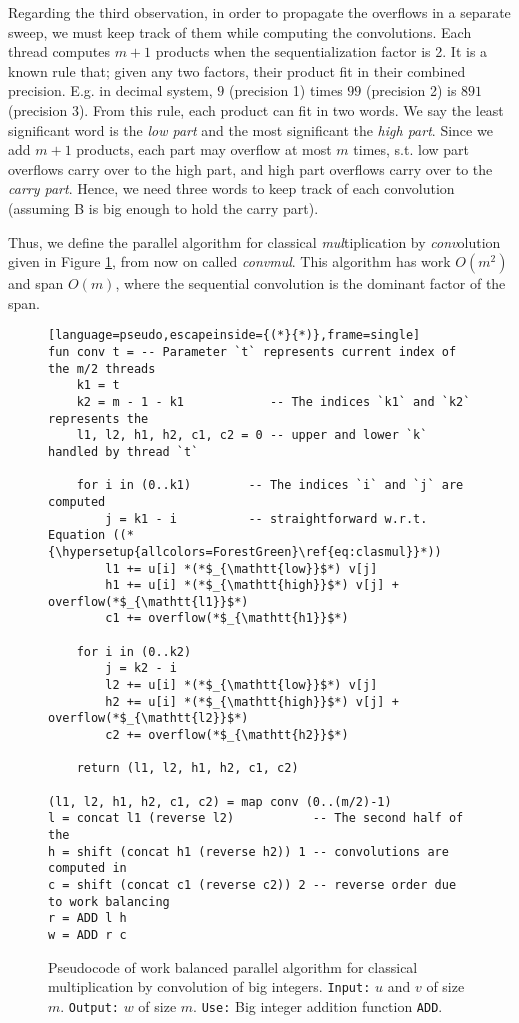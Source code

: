 Regarding the third observation, in order to propagate the overflows in a
separate sweep, we must keep track of them while computing the
convolutions. Each thread computes $m+1$ products when the sequentialization
factor is 2. It is a known rule that; given any two factors, their product fit
in their combined precision. E.g. in decimal system, $9$ (precision 1) times
$99$ (precision 2) is $891$ (precision 3). From this rule, each product can fit
in two words. We say the least significant word is the \textit{low part} and the
most significant the \textit{high part}. Since we add $m+1$ products, each part
may overflow at most $m$ times, s.t. low part overflows carry over to the high
part, and high part overflows carry over to the \textit{carry part}. Hence, we
need three words to keep track of each convolution (assuming B is big enough to
hold the carry part).

Thus, we define the parallel algorithm for classical \textit{mul}tiplication by
\textit{conv}olution given in Figure \ref{fig:mulparalg}, from now on called
\textit{convmul}. This algorithm has work $O(m^2)$ and span $O(m)$, where the
sequential convolution is the dominant factor of the span.

\begin{figure}
\begin{lstlisting}[language=pseudo,escapeinside={(*}{*)},frame=single]
fun conv t = -- Parameter `t` represents current index of the m/2 threads
    k1 = t
    k2 = m - 1 - k1            -- The indices `k1` and `k2` represents the
    l1, l2, h1, h2, c1, c2 = 0 -- upper and lower `k` handled by thread `t`

    for i in (0..k1)        -- The indices `i` and `j` are computed
        j = k1 - i          -- straightforward w.r.t. Equation ((*{\hypersetup{allcolors=ForestGreen}\ref{eq:clasmul}}*))
        l1 += u[i] *(*$_{\mathtt{low}}$*) v[j]
        h1 += u[i] *(*$_{\mathtt{high}}$*) v[j] + overflow(*$_{\mathtt{l1}}$*)
        c1 += overflow(*$_{\mathtt{h1}}$*)

    for i in (0..k2)
        j = k2 - i
        l2 += u[i] *(*$_{\mathtt{low}}$*) v[j]
        h2 += u[i] *(*$_{\mathtt{high}}$*) v[j] + overflow(*$_{\mathtt{l2}}$*)
        c2 += overflow(*$_{\mathtt{h2}}$*)

    return (l1, l2, h1, h2, c1, c2)

(l1, l2, h1, h2, c1, c2) = map conv (0..(m/2)-1)
l = concat l1 (reverse l2)           -- The second half of the
h = shift (concat h1 (reverse h2)) 1 -- convolutions are computed in
c = shift (concat c1 (reverse c2)) 2 -- reverse order due to work balancing
r = ADD l h
w = ADD r c
\end{lstlisting}
  \caption{\footnotesize Pseudocode of work balanced parallel algorithm for classical multiplication by convolution of big integers. \texttt{Input:} $u$ and $v$ of size $m$. \texttt{Output:} $w$ of size $m$. \texttt{Use:} Big integer addition function \texttt{ADD}.}
  \label{fig:mulparalg}
\end{figure}

